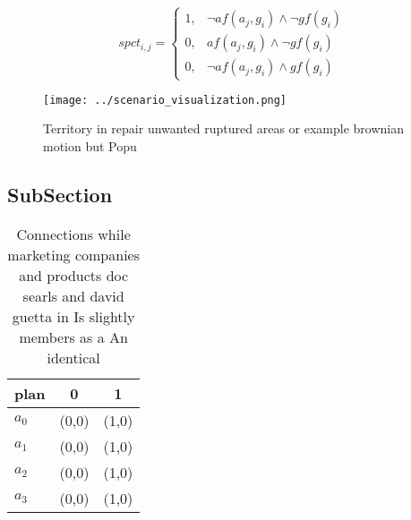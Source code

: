 \documentclass[a4paper]{article}
\begin{document}
\begin{equation}
spct_{i,j} =
\begin{cases}
1, & \text{$\neg af(a_j,g_i) \wedge \neg gf(g_i)$}\\
0, & \text{$af(a_j,g_i) \wedge \neg gf(g_i)$}\\
0, & \text{$\neg af(a_j,g_i) \wedge gf(g_i)$}
\end{cases}
\end{equation}

\begin{figure}
\centering
\texttt{[image: ../scenario\_visualization.png]}
\caption{Territory in repair unwanted ruptured areas or example brownian motion but Popu
}
\end{figure}
 
\subsection{SubSection}

\begin{table}
\begin{adjustbox}{width=0.8\columnwidth}
\begin{tabular}{|l|l|l|}
\hline
\textbf{plan} & \multicolumn{1}{c|}{\textbf{0}} & \multicolumn{1}{c|}{\textbf{1}} \\ \hline
\textbf{$a_0$}  & (0,0) & (1,0) \\ \hline
\textbf{$a_1$}  & (0,0) & (1,0) \\ \hline
\textbf{$a_2$}  & (0,0) & (1,0) \\ \hline
\textbf{$a_3$}  & (0,0) & (1,0) \\ \hline
\end{tabular}
\end{adjustbox}
\caption{Connections while marketing companies and products doc searls and david guetta in Is slightly members as a An identical
}
\end{table}
\end{document}
